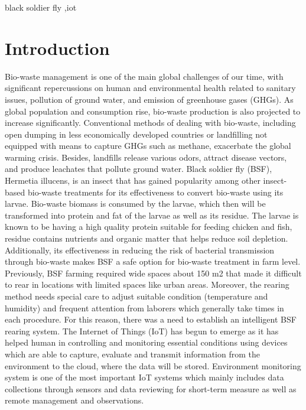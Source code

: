 \documentclass[conference]{IEEEtran}
\begin{document}
    \begin{IEEEkeywords}
        black soldier fly ,iot
    \end{IEEEkeywords}

    \section{Introduction}
Bio-waste management is one of the main global challenges of our time, with significant repercussions on human and environmental health related to sanitary issues, pollution of ground water, and emission of greenhouse gases (GHGs). As global population and consumption rise, bio-waste production is also projected to increase significantly. Conventional methods of dealing with bio-waste, including open dumping in less economically developed countries or landfilling not equipped with means to capture GHGs such as methane, exacerbate the global warming crisis. Besides, landfills release various odors, attract disease vectors, and produce leachates that pollute ground water.
Black soldier fly (BSF), Hermetia illucens, is an insect that has gained popularity among other insect-based bio-waste treatments for its effectiveness to convert bio-waste using its larvae. Bio-waste biomass is consumed by the larvae, which then will be transformed into protein and fat of the larvae as well as its residue. The larvae is known to be having a high quality protein suitable for feeding chicken and fish, residue contains nutrients and organic matter that helps reduce soil depletion. Additionally, its effectiveness in reducing the risk of bacterial transmission through bio-waste makes BSF a safe option for bio-waste treatment in farm level.
Previously, BSF farming required wide spaces about 150 m2 that made it difficult to rear in locations with limited spaces like urban areas. Moreover, the rearing method needs special care to adjust suitable condition (temperature and humidity) and frequent attention from laborers which generally take times in each procedure.  For this reason, there was a need to establish an intelligent BSF rearing system.
The Internet of Things (IoT) has begun to emerge as it has helped human in controlling and monitoring essential conditions using devices which are able to capture, evaluate and transmit information from the environment to the cloud, where the data will be stored. Environment monitoring system is one of the most important IoT systems which mainly includes data collections through sensors and data reviewing for short-term measure as well as remote management and observations.
\end{document}

